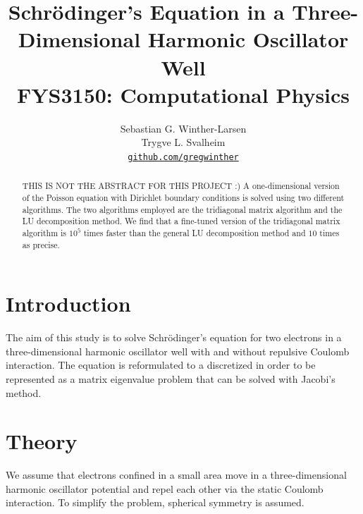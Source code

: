 \documentclass[10pt, a4paper]{amsart}
\title[Schrödinger's Equation in 3D]{Schrödinger's Equation in a Three-Dimensional Harmonic Oscillator Well \\
  \hrulefill\small{ FYS3150: Computational Physics }\hrulefill}
\author[Winther-Larsen \& Svalheim]{Sebastian G. Winther-Larsen \\ 
Trygve L. Svalheim \\
\href{https://github.com/gregwinther/FYS3150/}{\texttt{github.com/gregwinther}}}
\begin{document}
\begin{titlepage}
\begin{abstract}
THIS IS NOT THE ABSTRACT FOR THIS PROJECT :)
A one-dimensional version of the Poisson equation with Dirichlet boundary conditions is solved using two different algorithms. The two algorithms employed are the tridiagonal matrix algorithm and the LU decomposition method. We find that a fine-tuned version of the tridiagonal matrix algorithm is $10^5$ times faster than the general LU decomposition method and $10$ times as precise.
\end{abstract}
\maketitle
\tableofcontents
\end{titlepage}

\section{Introduction}

The aim of this study is to solve Schrödinger's equation for two electrons in a three-dimensional  harmonic oscillator well with and without repulsive Coulomb interaction. The equation is reformulated to a discretized in order to be represented as a matrix eigenvalue problem that can be solved with Jacobi's method. 

\section{Theory}
We assume that electrons confined in a small area move in a three-dimensional harmonic oscillator potential and repel each other via the static Coulomb interaction. To simplify the problem, spherical symmetry is assumed. 
\end{document}
